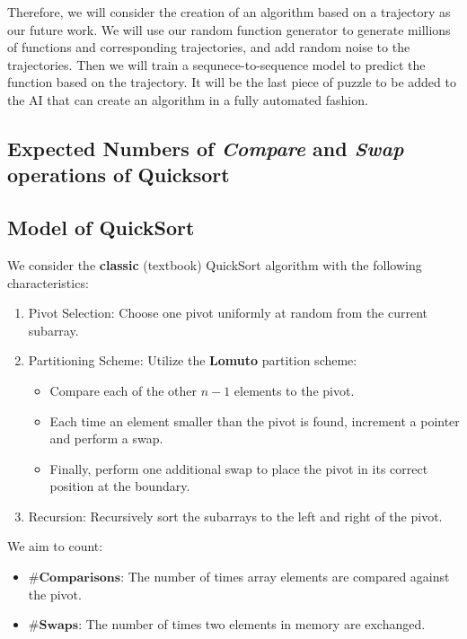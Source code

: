 \documentclass[pdflatex,sn-mathphys-num]{sn-jnl}%
\theoremstyle{thmstyleone}%
\theoremstyle{thmstyletwo}%
\theoremstyle{thmstylethree}%
\begin{document}
Therefore, we will consider the creation of an algorithm based on a trajectory as our future work. We will use our random function generator to generate millions of functions and corresponding trajectories, and add random noise to the trajectories. Then we will train a sequnece-to-sequence model to predict the function based on the trajectory. It will be the last piece of puzzle to be added to the AI that can create an algorithm in a fully automated fashion.


\begin{appendices}

\section{Expected Numbers of \emph{Compare} and \emph{Swap} operations of Quicksort}\label{secA1}

\subsection{Model of QuickSort}

We consider the \textbf{classic} (textbook) QuickSort algorithm with the following characteristics:

\begin{enumerate}
    \item Pivot Selection: Choose one pivot uniformly at random from the current subarray.
    \item Partitioning Scheme: Utilize the \textbf{Lomuto} partition scheme:
    \begin{itemize}
        \item Compare each of the other \( n-1 \) elements to the pivot.
        \item Each time an element smaller than the pivot is found, increment a pointer and perform a swap.
        \item Finally, perform one additional swap to place the pivot in its correct position at the boundary.
    \end{itemize}
    \item Recursion: Recursively sort the subarrays to the left and right of the pivot.
\end{enumerate}

We aim to count:
\begin{itemize}
    \item \(\textbf{\#Comparisons}\): The number of times array elements are compared against the pivot.
    \item \(\textbf{\#Swaps}\): The number of times two elements in memory are exchanged.
\end{itemize}


\end{appendices}
\end{document}
